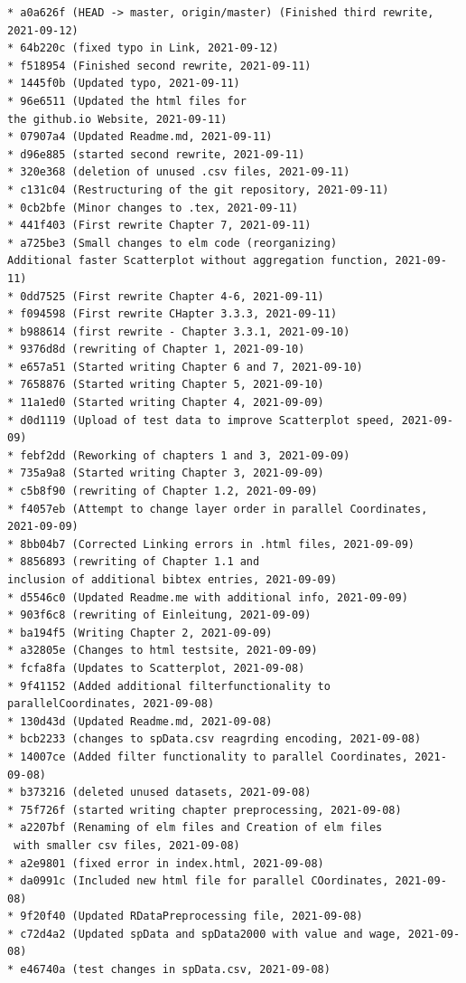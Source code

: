 \documentclass[usegeometry=true]{scrartcl}
\begin{document}
\begin{verbatim}
* a0a626f (HEAD -> master, origin/master) (Finished third rewrite, 2021-09-12)
* 64b220c (fixed typo in Link, 2021-09-12)
* f518954 (Finished second rewrite, 2021-09-11)
* 1445f0b (Updated typo, 2021-09-11)
* 96e6511 (Updated the html files for 
the github.io Website, 2021-09-11)
* 07907a4 (Updated Readme.md, 2021-09-11)
* d96e885 (started second rewrite, 2021-09-11)
* 320e368 (deletion of unused .csv files, 2021-09-11)
* c131c04 (Restructuring of the git repository, 2021-09-11)
* 0cb2bfe (Minor changes to .tex, 2021-09-11)
* 441f403 (First rewrite Chapter 7, 2021-09-11)
* a725be3 (Small changes to elm code (reorganizing) 
Additional faster Scatterplot without aggregation function, 2021-09-11)
* 0dd7525 (First rewrite Chapter 4-6, 2021-09-11)
* f094598 (First rewrite CHapter 3.3.3, 2021-09-11)
* b988614 (first rewrite - Chapter 3.3.1, 2021-09-10)
* 9376d8d (rewriting of Chapter 1, 2021-09-10)
* e657a51 (Started writing Chapter 6 and 7, 2021-09-10)
* 7658876 (Started writing Chapter 5, 2021-09-10)
* 11a1ed0 (Started writing Chapter 4, 2021-09-09)
* d0d1119 (Upload of test data to improve Scatterplot speed, 2021-09-09)
* febf2dd (Reworking of chapters 1 and 3, 2021-09-09)
* 735a9a8 (Started writing Chapter 3, 2021-09-09)
* c5b8f90 (rewriting of Chapter 1.2, 2021-09-09)
* f4057eb (Attempt to change layer order in parallel Coordinates, 2021-09-09)
* 8bb04b7 (Corrected Linking errors in .html files, 2021-09-09)
* 8856893 (rewriting of Chapter 1.1 and 
inclusion of additional bibtex entries, 2021-09-09)
* d5546c0 (Updated Readme.me with additional info, 2021-09-09)
* 903f6c8 (rewriting of Einleitung, 2021-09-09)
* ba194f5 (Writing Chapter 2, 2021-09-09)
* a32805e (Changes to html testsite, 2021-09-09)
* fcfa8fa (Updates to Scatterplot, 2021-09-08)
* 9f41152 (Added additional filterfunctionality to parallelCoordinates, 2021-09-08)
* 130d43d (Updated Readme.md, 2021-09-08)
* bcb2233 (changes to spData.csv reagrding encoding, 2021-09-08)
* 14007ce (Added filter functionality to parallel Coordinates, 2021-09-08)
* b373216 (deleted unused datasets, 2021-09-08)
* 75f726f (started writing chapter preprocessing, 2021-09-08)
* a2207bf (Renaming of elm files and Creation of elm files
 with smaller csv files, 2021-09-08)
* a2e9801 (fixed error in index.html, 2021-09-08)
* da0991c (Included new html file for parallel COordinates, 2021-09-08)
* 9f20f40 (Updated RDataPreprocessing file, 2021-09-08)
* c72d4a2 (Updated spData and spData2000 with value and wage, 2021-09-08)
* e46740a (test changes in spData.csv, 2021-09-08)

\end{verbatim}
\end{document}
